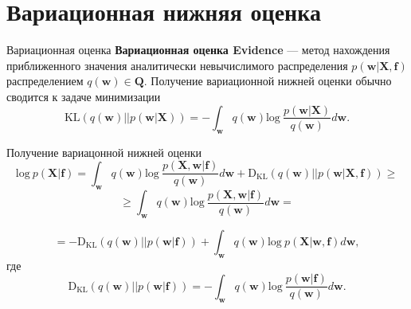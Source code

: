 \documentclass[10pt,pdf,utf8,russian,aspectratio=169]{beamer}
\begin{document}
\section{Вариационная нижняя оценка}
\begin{frame}{Вариационная оценка}
\textbf{Вариационная оценка Evidence} --- метод нахождения приближенного значения аналитически невычислимого распределения $p(\mathbf{w}|\mathbf{X}, \mathbf{f})$ распределением $q(\mathbf{w}) \in \mathbf{Q}$. Получение вариационной нижней оценки обычно сводится к задаче минимизации
$$\text{KL}(q(\mathbf{w})||p(\mathbf{w}| \mathbf{X}))=
-\int_{\mathbf{w}} q(\mathbf{w}) \text{log}~\frac{p(\mathbf{w}| \mathbf{X})} {q(\mathbf{w})}d\mathbf{w}.
$$

\begin{figure}
  \centering
\label{fig:1}\qquad

\end{figure}

\end{frame}

\begin{frame}{Получение вариацонной нижней оценки}
$$
\text{log}~p(\mathbf{X}| \mathbf{f})  = \int_{\mathbf{w}} q(\mathbf{w})\text{log}~\frac{p(\mathbf{X},\mathbf{w}|\mathbf{f})}{q(\mathbf{w})}d\mathbf{w} + \text{D}_\text{KL}  (q(\mathbf{w})||p(\mathbf{w}| \mathbf{X}, \mathbf{f})) \geq	
$$
$$
\geq \int_{\mathbf{w}} q(\mathbf{w})\text{log}~\frac{p(\mathbf{X},\mathbf{w}|\mathbf{f})}{q(\mathbf{w})}d\mathbf{w} =
$$

$$
= -\text{D}_\text{KL} (q(\mathbf{w})||p(\mathbf{w}|\mathbf{f})) + \int_{\mathbf{w}} q(\mathbf{w})\text{log}~{p(\mathbf{X}|\mathbf{w},\mathbf{f})} d \mathbf{w},
$$
где $$\text{D}_\text{KL}(q(\mathbf{w})||p(\mathbf{w} |\mathbf{f})) = -\int_{\mathbf{w}} q(\mathbf{w})\text{log}~\frac{p(\mathbf{w} | \mathbf{f})}{q(\mathbf{w})}d\mathbf{w}.$$

\end{frame}
\end{document}
